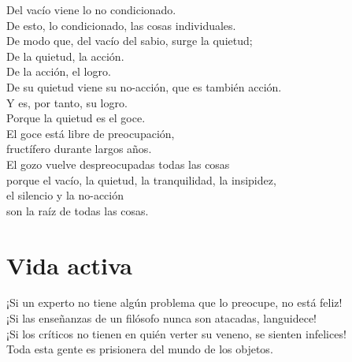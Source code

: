 \documentclass[hidelinks]{memoir}
\begin{document}
	Del vacío viene lo no condicionado.\\
	De esto, lo condicionado, las cosas individuales.\\
	De modo que, del vacío del sabio, surge la quietud;\\
	De la quietud, la acción.\\
	De la acción, el logro.\\
	De su quietud viene su no-acción, que es también acción.\\
	Y es, por tanto, su logro.\\
	Porque la quietud es el goce.\\
	El goce está libre de preocupación,\\
	fructífero durante largos años.\\
	El gozo vuelve despreocupadas todas las cosas\\
	porque el vacío, la quietud, la tranquilidad, la insipidez,\\
	el silencio y la no-acción\\
	son la raíz de todas las cosas.
	
	\chapter*{Vida activa}
	
	¡Si un experto no tiene algún problema que lo preocupe, no está feliz!\\
	¡Si las enseñanzas de un filósofo nunca son atacadas, languidece!\\
	¡Si los críticos no tienen en quién verter su veneno, se sienten
	infelices!\\
	Toda esta gente es prisionera del mundo de los objetos.
	
\end{document}
